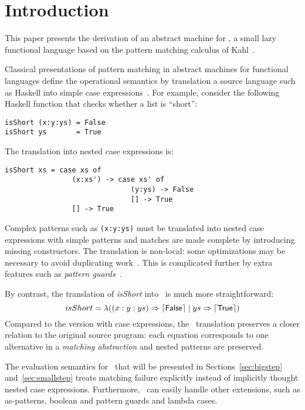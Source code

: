 \section{Introduction}

This paper presents the derivation of an abstract machine for \lambdaPMC, a small
lazy functional language based on the pattern matching calculus
of Kahl~\cite{kahl_2004}.

Classical presentations of pattern matching in abstract machines for
functional languages define the operational semantics by translation
a source language such as Haskell
into simple case expressions~\cite{spj_1987,jones_1992}. For
example, consider the following Haskell function that checks whether a
list is ``short'':
\begin{verbatim}
isShort (x:y:ys) = False
isShort ys       = True
\end{verbatim}
The translation into nested case expressions is:
\begin{verbatim}
isShort xs = case xs of
                (x:xs') -> case xs' of
                              (y:ys) -> False
                              [] -> True
                [] -> True
\end{verbatim}
Complex patterns such as \verb|(x:y:ys)| must be translated into 
nested case expressions with simple patterns and
matches are made complete by introducing missing constructors.
The translation is non-local: some optimizations may be 
necessary to avoid duplicating work~\cite{spj_1987}.
This is complicated further by extra features
such as \emph{pattern guards}~\cite{haskell_2010_report}.

By contrast, the translation of \textit{isShort} into \lambdaPMC\ is much more
straightforward:
\[
  isShort = \lambda ((x:y:ys) \Rightarrow \left\lceil \textsf{False}\right\rceil \mid
                     ys \Rightarrow \left\lceil \textsf{True}\right\rceil)
\]
Compared to the version with case expressions, the \lambdaPMC\ translation
preserves a closer relation to the original source program: each
equation corresponds to one alternative in a \emph{matching
  abstraction} and nested patterns are preserved. 

The evaluation semantics for \lambdaPMC\ that will be presented in
Sections~\ref{sec:bigstep} and~\ref{sec:smallstep} treats matching
failure explicitly instead of implicitly thought nested case
expressions. Furthermore, \lambdaPMC\ can easily handle
other extensions, such as as-patterns, boolean and
pattern guards and lambda cases.

